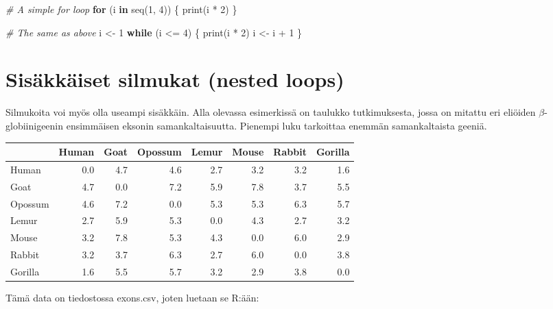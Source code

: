 \documentclass[
]{book}
\newenvironment{Shaded}{\begin{snugshade}}{\end{snugshade}}
\newcommand{\CommentTok}[1]{\textcolor[rgb]{0.56,0.35,0.01}{\textit{#1}}}
\newcommand{\ControlFlowTok}[1]{\textcolor[rgb]{0.13,0.29,0.53}{\textbf{#1}}}
\newcommand{\DecValTok}[1]{\textcolor[rgb]{0.00,0.00,0.81}{#1}}
\newcommand{\FunctionTok}[1]{\textcolor[rgb]{0.00,0.00,0.00}{#1}}
\newcommand{\NormalTok}[1]{#1}
\newcommand{\OtherTok}[1]{\textcolor[rgb]{0.56,0.35,0.01}{#1}}
\newcommand{\SpecialCharTok}[1]{\textcolor[rgb]{0.00,0.00,0.00}{#1}}
\begin{document}
\begin{Shaded}
\begin{Highlighting}[]
\CommentTok{\# A simple for loop}
\ControlFlowTok{for}\NormalTok{ (i }\ControlFlowTok{in} \FunctionTok{seq}\NormalTok{(}\DecValTok{1}\NormalTok{, }\DecValTok{4}\NormalTok{)) \{}
  \FunctionTok{print}\NormalTok{(i }\SpecialCharTok{*} \DecValTok{2}\NormalTok{)}
\NormalTok{\}}

\CommentTok{\# The same as above}
\NormalTok{i }\OtherTok{\textless{}{-}} \DecValTok{1}
\ControlFlowTok{while}\NormalTok{ (i }\SpecialCharTok{\textless{}=} \DecValTok{4}\NormalTok{) \{}
  \FunctionTok{print}\NormalTok{(i }\SpecialCharTok{*} \DecValTok{2}\NormalTok{)}
\NormalTok{  i }\OtherTok{\textless{}{-}}\NormalTok{ i }\SpecialCharTok{+} \DecValTok{1}
\NormalTok{\}}
\end{Highlighting}
\end{Shaded}

\hypertarget{sisuxe4kkuxe4iset-silmukat-nested-loops}{%
\section{Sisäkkäiset silmukat (nested loops)}\label{sisuxe4kkuxe4iset-silmukat-nested-loops}}

Silmukoita voi myös olla useampi sisäkkäin. Alla olevassa esimerkissä on taulukko tutkimuksesta, jossa on mitattu eri eliöiden \(\beta\)- globiinigeenin ensimmäisen eksonin samankaltaisuutta. Pienempi luku tarkoittaa enemmän samankaltaista geeniä.

\begin{tabular}{l|r|r|r|r|r|r|r}
\hline
  & Human & Goat & Opossum & Lemur & Mouse & Rabbit & Gorilla\\
\hline
Human & 0.0 & 4.7 & 4.6 & 2.7 & 3.2 & 3.2 & 1.6\\
\hline
Goat & 4.7 & 0.0 & 7.2 & 5.9 & 7.8 & 3.7 & 5.5\\
\hline
Opossum & 4.6 & 7.2 & 0.0 & 5.3 & 5.3 & 6.3 & 5.7\\
\hline
Lemur & 2.7 & 5.9 & 5.3 & 0.0 & 4.3 & 2.7 & 3.2\\
\hline
Mouse & 3.2 & 7.8 & 5.3 & 4.3 & 0.0 & 6.0 & 2.9\\
\hline
Rabbit & 3.2 & 3.7 & 6.3 & 2.7 & 6.0 & 0.0 & 3.8\\
\hline
Gorilla & 1.6 & 5.5 & 5.7 & 3.2 & 2.9 & 3.8 & 0.0\\
\hline
\end{tabular}

Tämä data on tiedostossa exons.csv, joten luetaan se R:ään:
\end{document}
